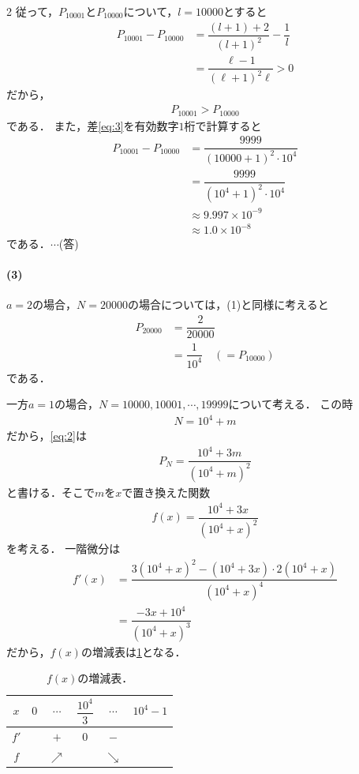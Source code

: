 \documentclass[../../main.tex]{subfiles}
\begin{document}
\begin{multicols}{2}
  従って，$P_{10001}$と$P_{10000}$について，$l=10000$とすると
  \begin{align}
    P_{10001} - P_{10000}
    & = \dfrac{(l+1)+2}{(l+1)^2} - \dfrac{1}{l}                  \\
    & = \dfrac{\ell-1}{(\ell+1)^2 \ell} > 0 \label{eq:3}
  \end{align}
  だから，
  \begin{align}
    P_{10001} > P_{10000}
  \end{align}
  である．
  また，差\cref{eq:3}を有効数字$1$桁で計算すると
  \begin{align}
    P_{10001} - P_{10000}
    & = \dfrac{9999}{(10000+1)^2 \cdot 10^4} \\
    & = \dfrac{9999}{(10^4+1)^2 \cdot 10^4}  \\
    & \approx 9.997 \times 10^{-9}          \\
    & \approx 1.0 \times 10^{-8}
  \end{align}
  である．$\cdots$(答)

  \paragraph{(3)}

  $a=2$の場合，$N=20000$の場合については，(1)と同様に考えると
  \begin{align}
    P_{20000}
    & = \dfrac{2}{20000}                                       \\
    & = \dfrac{1}{10^4} \quad (=P_{10000}) \label{eq:4}
  \end{align}
  である．

  一方$a=1$の場合，$N=10000,10001,\cdots,19999$について考える．
  この時
  \begin{align}
    N = 10^4 + m
  \end{align}
  だから，\cref{eq:2}は
  \begin{align}
    P_{N} = \dfrac{10^4+3m}{(10^4+m)^2}
  \end{align}
  と書ける．そこで$m$を$x$で置き換えた関数
  \begin{align}
    f(x) = \dfrac{10^4+3x}{(10^4+x)^2}
  \end{align}
  を考える．
  一階微分は
  \begin{align}
    f'(x) & = \dfrac{3(10^4+x)^2 - (10^4+3x) \cdot 2(10^4+x)}{(10^4+x)^4} \\
    & = \dfrac{-3x+10^4}{(10^4+x)^3}
  \end{align}
  だから，$f(x)$の増減表は\cref{1997-3:table:1}となる．
  \begin{table}[H]
    \centering
    \caption{$f(x)$の増減表．}
    \label{1997-3:table:1}
    \begin{tabular}{|c||c|c|c|c|c|}
      \hline
      $x$  & $0$ & $\cdots$   & $\dfrac{10^4}{3}$ & $\cdots$   & $10^4-1$ \\
      \hline
      $f'$ &     & $+$        & $0$              & $-$        &          \\
      \hline
      $f$  &     & $\nearrow$ &                  & $\searrow$ &          \\
      \hline
    \end{tabular}
  \end{table}


\end{multicols}
\end{document}
